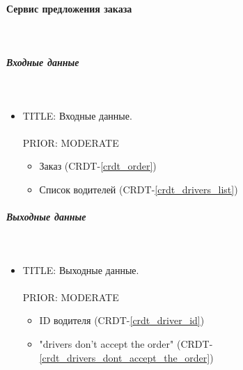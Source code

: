\paragraph{Сервис предложения заказа} \mbox{} \\ \label{order_offering_service}

    \subparagraph{Входные данные} \mbox{} \\ \label{}

      \begin{itemize}

        \item{

          TITLE: Входные данные.\\
          \\
          PRIOR: MODERATE\\

        }

        \begin{itemize}
          \item Заказ (CRDT-\ref{crdt_order})
          \item Список водителей (CRDT-\ref{crdt_drivers_list})
        \end{itemize}

      \end{itemize}

    \subparagraph{Выходные данные} \mbox{} \\

      \begin{itemize}

        \item{

          TITLE: Выходные данные.\\
          \\
          PRIOR: MODERATE\\

        }

        \begin{itemize}
          \item ID водителя (CRDT-\ref{crdt_driver_id})
          \item "drivers don't accept the order" (CRDT-\ref{crdt_drivers_dont_accept_the_order})
        \end{itemize}

      \end{itemize}

